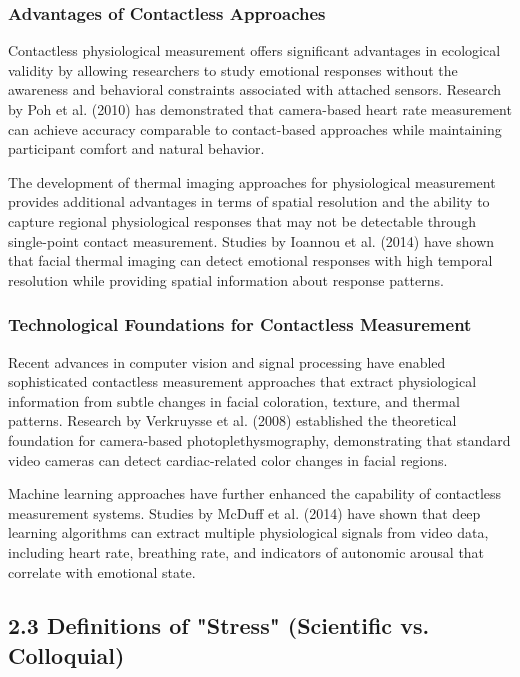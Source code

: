 \documentclass[11pt,a4paper]{article}
\begin{document}
\subsubsection{Advantages of Contactless Approaches}

Contactless physiological measurement offers significant advantages in ecological validity by allowing researchers to
study emotional responses without the awareness and behavioral constraints associated with attached sensors. Research by
Poh et al. (2010) has demonstrated that camera-based heart rate measurement can achieve accuracy comparable to
contact-based approaches while maintaining participant comfort and natural behavior.

The development of thermal imaging approaches for physiological measurement provides additional advantages in terms of
spatial resolution and the ability to capture regional physiological responses that may not be detectable through
single-point contact measurement. Studies by Ioannou et al. (2014) have shown that facial thermal imaging can detect
emotional responses with high temporal resolution while providing spatial information about response patterns.

\subsubsection{Technological Foundations for Contactless Measurement}

Recent advances in computer vision and signal processing have enabled sophisticated contactless measurement approaches
that extract physiological information from subtle changes in facial coloration, texture, and thermal patterns. Research
by Verkruysse et al. (2008) established the theoretical foundation for camera-based photoplethysmography, demonstrating
that standard video cameras can detect cardiac-related color changes in facial regions.

Machine learning approaches have further enhanced the capability of contactless measurement systems. Studies by McDuff
et al. (2014) have shown that deep learning algorithms can extract multiple physiological signals from video data,
including heart rate, breathing rate, and indicators of autonomic arousal that correlate with emotional state.

\subsection{2.3 Definitions of "Stress" (Scientific vs. Colloquial)}
\end{document}
